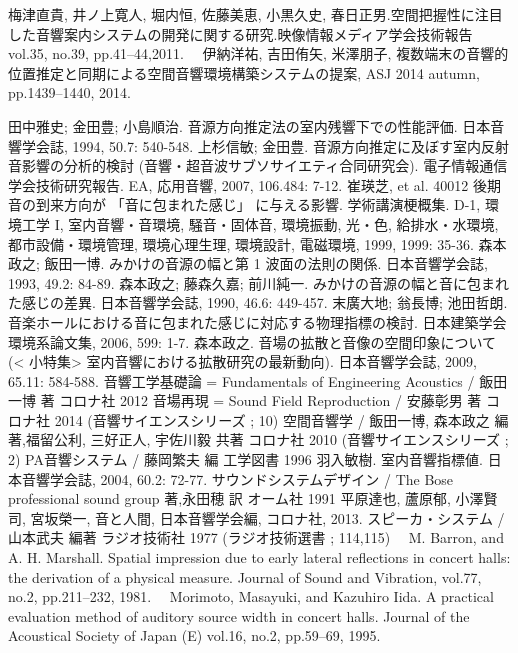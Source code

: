 \begin{thebibliography}{99}
   梅津直貴, 井ノ上寛人, 堀内恒, 佐藤美恵, 小黒久史, 春日正男.空間把握性に注目した音響案内システムの開発に関する研究.映像情報メディア学会技術報告 vol.35, no.39, pp.41--44,2011.
　伊納洋祐, 吉田侑矢, 米澤朋子,	複数端末の音響的位置推定と同期による空間音響環境構築システムの提案,	ASJ 2014 autumn,	pp.1439--1440,	2014.

 田中雅史; 金田豊; 小島順治. 音源方向推定法の室内残響下での性能評価. 日本音響学会誌, 1994, 50.7: 540-548.
 上杉信敏; 金田豊. 音源方向推定に及ぼす室内反射音影響の分析的検討 (音響・超音波サブソサイエティ合同研究会). 電子情報通信学会技術研究報告. EA, 応用音響, 2007, 106.484: 7-12.
 崔瑛芝, et al. 40012 後期音の到来方向が 「音に包まれた感じ」 に与える影響. 学術講演梗概集. D-1, 環境工学 I, 室内音響・音環境, 騒音・固体音, 環境振動, 光・色, 給排水・水環境, 都市設備・環境管理, 環境心理生理, 環境設計, 電磁環境, 1999, 1999: 35-36.
 森本政之; 飯田一博. みかけの音源の幅と第 1 波面の法則の関係. 日本音響学会誌, 1993, 49.2: 84-89.
 森本政之; 藤森久嘉; 前川純一. みかけの音源の幅と音に包まれた感じの差異. 日本音響学会誌, 1990, 46.6:	449-457.
 末廣大地; 翁長博; 池田哲朗. 音楽ホールにおける音に包まれた感じに対応する物理指標の検討. 日本建築学会環境系論文集, 2006, 599: 1-7.
 森本政之. 音場の拡散と音像の空間印象について (< 小特集> 室内音響における拡散研究の最新動向). 日本音響学会誌, 2009, 65.11: 584-588.
 音響工学基礎論 = Fundamentals of Engineering Acoustics / 飯田一博 著 コロナ社 2012
 音場再現 = Sound Field Reproduction / 安藤彰男 著 コロナ社 2014 (音響サイエンスシリーズ ; 10)
 空間音響学 / 飯田一博, 森本政之 編著,福留公利, 三好正人, 宇佐川毅 共著 コロナ社 2010 (音響サイエンスシリーズ ; 2)
 PA音響システム / 藤岡繁夫 編 工学図書 1996
 羽入敏樹. 室内音響指標値. 日本音響学会誌, 2004, 60.2: 72-77.
 サウンドシステムデザイン / The Bose professional sound group 著,永田穂 訳 オーム社 1991
     平原達也, 蘆原郁, 小澤賢司, 宮坂榮一, 音と人間, 日本音響学会編, コロナ社, 2013.
 スピーカ・システム / 山本武夫 編著 ラジオ技術社 1977 (ラジオ技術選書 ; 114,115)
　M. Barron, and A. H. Marshall. Spatial impression due to early lateral reflections in concert halls: the derivation of a physical measure. Journal of Sound and Vibration, vol.77, no.2, pp.211--232, 1981.
　Morimoto, Masayuki, and Kazuhiro Iida. A practical evaluation method of auditory source width in concert halls. Journal of the Acoustical Society of Japan (E) vol.16, no.2, pp.59--69, 1995.

\end{thebibliography}
